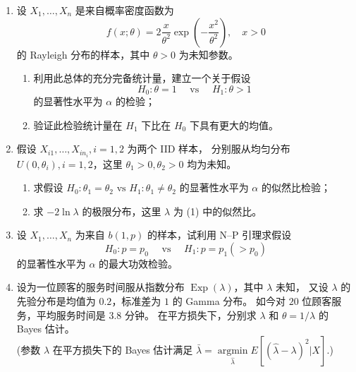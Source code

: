 \begin{enumerate}
分别为来自参数为 $\lambda_{1}$ 和 $\lambda_{2}$ 的指数分布的样本，且全样本独立，
试求 $\lambda_{2} / \lambda_{1}$ 的置信水平为 $1-\alpha$ 的置信区间。
\item 设 $X_{1}, \ldots, X_{n}$ 是来自概率密度函数为
$$f(x;\theta)=2 \frac{x}{\theta^{2}} \exp \left(-\frac{x^{2}}{\theta^{2}}\right), \quad x>0$$
的 Rayleigh 分布的样本，其中 $\theta>0$ 为未知参数。
\begin{enumerate}[label=(\arabic*)]
\item 利用此总体的充分完备统计量，建立一个关于假设
$$H_{0}: \theta=1 \quad \text{ vs } \quad H_{1}: \theta>1$$
的显著性水平为 $\alpha$ 的检验；
\item 验证此检验统计量在 $H_{1}$ 下比在 $H_{0}$ 下具有更大的均值。
\end{enumerate}
\item 假设 $X_{i 1}, \ldots, X_{i n_{i}}, i=1,2$ 为两个 IID 样本，
分别服从均匀分布 $U(0, \theta_{i}), i=1,2$，这里 $\theta_{1}> 0, \theta_{2}>0$ 均为未知。
\begin{enumerate}[label=(\arabic*)]
\item 求假设 $H_{0}: \theta_{1}=\theta_{2} \text{ vs } H_{1}: \theta_{1} \neq \theta_{2}$ 的显著性水平为 $\alpha$ 的似然比检验；
\item 求 $-2 \ln \lambda$ 的极限分布，这里 $\lambda$ 为 (1) 中的似然比。
\end{enumerate}
\item 设 $X_{1}, \ldots, X_{n}$ 为来自 $b(1,p)$ 的样本，试利用 N--P 引理求假设
$$H_{0}: p=p_{0} \quad \text { vs } \quad H_{1}: p=p_{1}(>p_{0})$$
的显著性水平为 $\alpha$ 的最大功效检验。
\item 设为一位顾客的服务时间服从指数分布 $\operatorname{Exp}(\lambda)$，其中 $\lambda$ 未知，
又设 $\lambda$ 的先验分布是均值为 $0.2$，标准差为 $1$ 的 Gamma 分布。
如今对 $20$ 位顾客服务，平均服务时间是 $3.8$ 分钟。
在平方损失下，分别求 $\lambda$ 和 $\theta=1/\lambda$ 的 Bayes 估计。\\
(参数 $\lambda$ 在平方损失下的 Bayes 估计满足 $\bar{\lambda}=\underset{\hat{\lambda}}{\operatorname{argmin}} E[(\hat{\lambda}-\lambda)^{2}|X]$.)


\end{enumerate}

